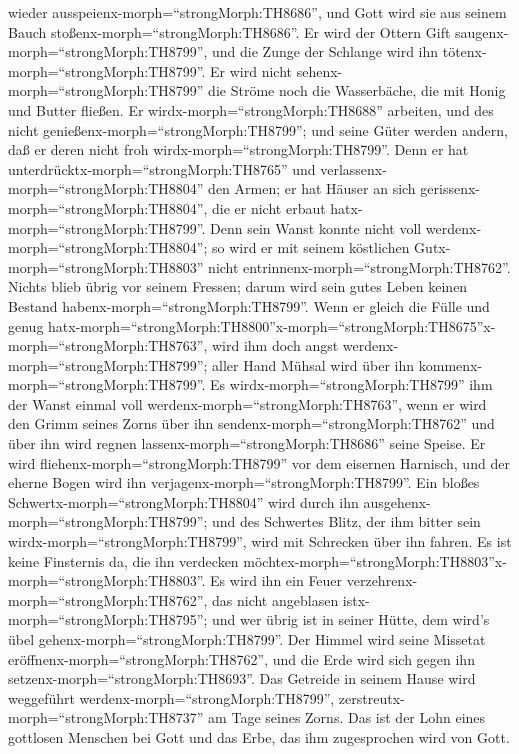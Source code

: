 wieder ausspeienx-morph=``strongMorph:TH8686'', und Gott wird sie aus
seinem Bauch stoßenx-morph=``strongMorph:TH8686''.  Er wird
der Ottern Gift saugenx-morph=``strongMorph:TH8799'', und die Zunge der
Schlange wird ihn tötenx-morph=``strongMorph:TH8799''.  Er
wird nicht sehenx-morph=``strongMorph:TH8799'' die Ströme noch die
Wasserbäche, die mit Honig und Butter fließen.  Er
wirdx-morph=``strongMorph:TH8688'' arbeiten, und des nicht
genießenx-morph=``strongMorph:TH8799''; und seine Güter werden andern,
daß er deren nicht froh wirdx-morph=``strongMorph:TH8799''.
 Denn er hat unterdrücktx-morph=``strongMorph:TH8765'' und
verlassenx-morph=``strongMorph:TH8804'' den Armen; er hat Häuser an sich
gerissenx-morph=``strongMorph:TH8804'', die er nicht erbaut
hatx-morph=``strongMorph:TH8799''.  Denn sein Wanst konnte
nicht voll werdenx-morph=``strongMorph:TH8804''; so wird er mit seinem
köstlichen Gutx-morph=``strongMorph:TH8803'' nicht
entrinnenx-morph=``strongMorph:TH8762''.  Nichts blieb
übrig vor seinem Fressen; darum wird sein gutes Leben keinen Bestand
habenx-morph=``strongMorph:TH8799''.  Wenn er gleich die
Fülle und genug
hatx-morph=``strongMorph:TH8800''\textbar x-morph=``strongMorph:TH8675''x-morph=``strongMorph:TH8763'',
wird ihm doch angst werdenx-morph=``strongMorph:TH8799''; aller Hand
Mühsal wird über ihn kommenx-morph=``strongMorph:TH8799''. 
Es wirdx-morph=``strongMorph:TH8799'' ihm der Wanst einmal voll
werdenx-morph=``strongMorph:TH8763'', wenn er wird den Grimm seines
Zorns über ihn sendenx-morph=``strongMorph:TH8762'' und über ihn wird
regnen lassenx-morph=``strongMorph:TH8686'' seine Speise. 
Er wird fliehenx-morph=``strongMorph:TH8799'' vor dem eisernen Harnisch,
und der eherne Bogen wird ihn verjagenx-morph=``strongMorph:TH8799''.
 Ein bloßes Schwertx-morph=``strongMorph:TH8804'' wird
durch ihn ausgehenx-morph=``strongMorph:TH8799''; und des Schwertes
Blitz, der ihm bitter sein wirdx-morph=``strongMorph:TH8799'', wird mit
Schrecken über ihn fahren.  Es ist keine Finsternis da, die
ihn verdecken
möchtex-morph=``strongMorph:TH8803''x-morph=``strongMorph:TH8803''. Es
wird ihn ein Feuer verzehrenx-morph=``strongMorph:TH8762'', das nicht
angeblasen istx-morph=``strongMorph:TH8795''; und wer übrig ist in
seiner Hütte, dem wird's übel gehenx-morph=``strongMorph:TH8799''.
 Der Himmel wird seine Missetat
eröffnenx-morph=``strongMorph:TH8762'', und die Erde wird sich gegen ihn
setzenx-morph=``strongMorph:TH8693''.  Das Getreide in
seinem Hause wird weggeführt werdenx-morph=``strongMorph:TH8799'',
zerstreutx-morph=``strongMorph:TH8737'' am Tage seines Zorns.
 Das ist der Lohn eines gottlosen Menschen bei Gott und das
Erbe, das ihm zugesprochen wird von Gott.

